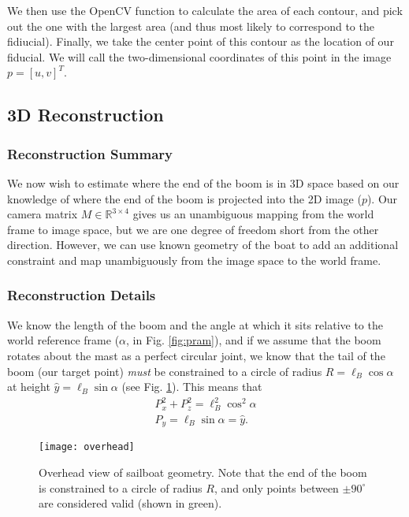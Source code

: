 \documentclass[letterpaper, 10 pt, conference]{ieeeconf}  %
\newcommand{\real}[1]{\mathbb{R}^{#1}}
\begin{document}
We then use the OpenCV function  to calculate the area of each contour, and pick out the one  with the largest area (and thus most likely to correspond to the fidiucial). Finally, we take the center point of this contour as the location of our fiducial. We will call the two-dimensional coordinates of this point in the image $p = [u,v]^T$.

\subsection{3D Reconstruction}
\label{sec:3d}
\subsubsection{Reconstruction Summary}
We now wish to estimate where the end of the boom is in 3D space based on our knowledge of where the end of the boom is projected into the 2D image ($p$). Our camera matrix $M \in \real{3 \times 4}$ gives us an unambiguous mapping from the world frame to image space, but we are one degree of freedom short from the other direction. However, we can use known geometry of the boat to add an additional constraint and map unambiguously from the image space to the world frame. 

\subsubsection{Reconstruction Details}

We know the length of the boom and the angle at which it sits relative to the world reference frame ($\alpha$, in Fig. \ref{fig:pram}), and if we assume that the boom rotates about the mast as a perfect circular joint, we know that the tail of the boom (our target point) \emph{must} be constrained to a circle of radius $R = \ell_B\cos{\alpha}$ at height $\hat{y} = \ell_B\sin\alpha$ (see Fig. \ref{fig:overhead}). This means that
\begin{gather}
P_x^2 + P_z^2 = \ell_B^2\cos^2{\alpha}\label{eq:planar}\\
P_y = \ell_B\sin\alpha = \hat{y}\label{eq:py}.
\end{gather}


\begin{figure}[htbp]
   \centering
   \texttt{[image: overhead]} %
   \caption{Overhead view of sailboat geometry. Note that the end of the boom is constrained to a circle of radius $R$, and only points between $\pm 90^\circ$ are considered valid (shown in green).}
   \label{fig:overhead}
\end{figure}
\end{document}
